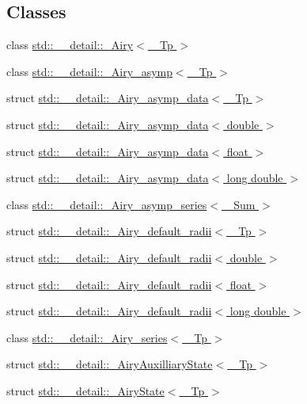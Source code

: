 \subsection*{Classes}
\begin{DoxyCompactItemize}
\item 
class \hyperlink{classstd_1_1____detail_1_1__Airy}{std\+::\+\_\+\+\_\+detail\+::\+\_\+\+Airy$<$ \+\_\+\+Tp $>$}
\item 
class \hyperlink{classstd_1_1____detail_1_1__Airy__asymp}{std\+::\+\_\+\+\_\+detail\+::\+\_\+\+Airy\+\_\+asymp$<$ \+\_\+\+Tp $>$}
\item 
struct \hyperlink{structstd_1_1____detail_1_1__Airy__asymp__data}{std\+::\+\_\+\+\_\+detail\+::\+\_\+\+Airy\+\_\+asymp\+\_\+data$<$ \+\_\+\+Tp $>$}
\item 
struct \hyperlink{structstd_1_1____detail_1_1__Airy__asymp__data_3_01double_01_4}{std\+::\+\_\+\+\_\+detail\+::\+\_\+\+Airy\+\_\+asymp\+\_\+data$<$ double $>$}
\item 
struct \hyperlink{structstd_1_1____detail_1_1__Airy__asymp__data_3_01float_01_4}{std\+::\+\_\+\+\_\+detail\+::\+\_\+\+Airy\+\_\+asymp\+\_\+data$<$ float $>$}
\item 
struct \hyperlink{structstd_1_1____detail_1_1__Airy__asymp__data_3_01long_01double_01_4}{std\+::\+\_\+\+\_\+detail\+::\+\_\+\+Airy\+\_\+asymp\+\_\+data$<$ long double $>$}
\item 
class \hyperlink{classstd_1_1____detail_1_1__Airy__asymp__series}{std\+::\+\_\+\+\_\+detail\+::\+\_\+\+Airy\+\_\+asymp\+\_\+series$<$ \+\_\+\+Sum $>$}
\item 
struct \hyperlink{structstd_1_1____detail_1_1__Airy__default__radii}{std\+::\+\_\+\+\_\+detail\+::\+\_\+\+Airy\+\_\+default\+\_\+radii$<$ \+\_\+\+Tp $>$}
\item 
struct \hyperlink{structstd_1_1____detail_1_1__Airy__default__radii_3_01double_01_4}{std\+::\+\_\+\+\_\+detail\+::\+\_\+\+Airy\+\_\+default\+\_\+radii$<$ double $>$}
\item 
struct \hyperlink{structstd_1_1____detail_1_1__Airy__default__radii_3_01float_01_4}{std\+::\+\_\+\+\_\+detail\+::\+\_\+\+Airy\+\_\+default\+\_\+radii$<$ float $>$}
\item 
struct \hyperlink{structstd_1_1____detail_1_1__Airy__default__radii_3_01long_01double_01_4}{std\+::\+\_\+\+\_\+detail\+::\+\_\+\+Airy\+\_\+default\+\_\+radii$<$ long double $>$}
\item 
class \hyperlink{classstd_1_1____detail_1_1__Airy__series}{std\+::\+\_\+\+\_\+detail\+::\+\_\+\+Airy\+\_\+series$<$ \+\_\+\+Tp $>$}
\item 
struct \hyperlink{structstd_1_1____detail_1_1__AiryAuxilliaryState}{std\+::\+\_\+\+\_\+detail\+::\+\_\+\+Airy\+Auxilliary\+State$<$ \+\_\+\+Tp $>$}
\item 
struct \hyperlink{structstd_1_1____detail_1_1__AiryState}{std\+::\+\_\+\+\_\+detail\+::\+\_\+\+Airy\+State$<$ \+\_\+\+Tp $>$}
\end{DoxyCompactItemize}
